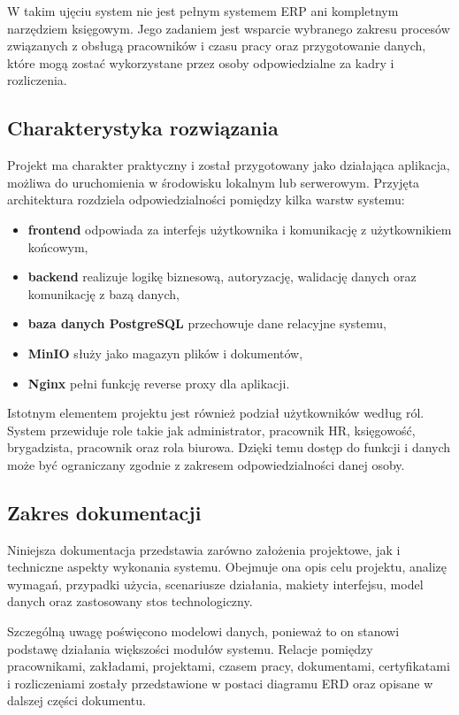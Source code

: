 W takim ujęciu system nie jest pełnym systemem ERP ani kompletnym narzędziem księgowym. Jego zadaniem jest wsparcie wybranego zakresu procesów związanych z obsługą pracowników i czasu pracy oraz przygotowanie danych, które mogą zostać wykorzystane przez osoby odpowiedzialne za kadry i rozliczenia.

\subsection{Charakterystyka rozwiązania}

Projekt ma charakter praktyczny i został przygotowany jako działająca aplikacja, możliwa do uruchomienia w środowisku lokalnym lub serwerowym. Przyjęta architektura rozdziela odpowiedzialności pomiędzy kilka warstw systemu:
\begin{itemize}
    \item \textbf{frontend} odpowiada za interfejs użytkownika i komunikację z użytkownikiem końcowym,
    \item \textbf{backend} realizuje logikę biznesową, autoryzację, walidację danych oraz komunikację z bazą danych,
    \item \textbf{baza danych PostgreSQL} przechowuje dane relacyjne systemu,
    \item \textbf{MinIO} służy jako magazyn plików i dokumentów,
    \item \textbf{Nginx} pełni funkcję reverse proxy dla aplikacji.
\end{itemize}

Istotnym elementem projektu jest również podział użytkowników według ról. System przewiduje role takie jak administrator, pracownik HR, księgowość, brygadzista, pracownik oraz rola biurowa. Dzięki temu dostęp do funkcji i danych może być ograniczany zgodnie z zakresem odpowiedzialności danej osoby.

\subsection{Zakres dokumentacji}

Niniejsza dokumentacja przedstawia zarówno założenia projektowe, jak i techniczne aspekty wykonania systemu. Obejmuje ona opis celu projektu, analizę wymagań, przypadki użycia, scenariusze działania, makiety interfejsu, model danych oraz zastosowany stos technologiczny.

Szczególną uwagę poświęcono modelowi danych, ponieważ to on stanowi podstawę działania większości modułów systemu. Relacje pomiędzy pracownikami, zakładami, projektami, czasem pracy, dokumentami, certyfikatami i rozliczeniami zostały przedstawione w postaci diagramu ERD oraz opisane w dalszej części dokumentu.

